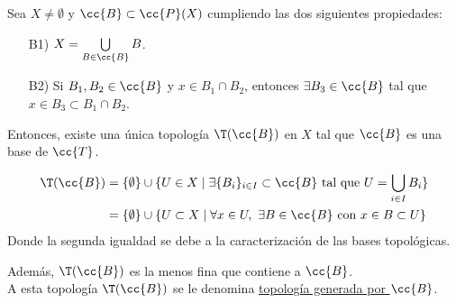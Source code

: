 \begin{teo}\label{teo:TopoGenerada_Bases}
    Sea $X\neq \emptyset$ y $\cc{B}\subset \cc{P}(X)$ cumpliendo las dos siguientes propiedades:
    \begin{enumerate}
        \item[B1)] $X=\bigcup\limits_{B\in \cc{B}} B$.
        \item[B2)] Si $B_1, B_2\in \cc{B}$ y $x\in B_1\cap B_2$, entonces $\exists B_3\in \cc{B}$ tal que $x\in B_3\subset B_1\cap B_2$.
    \end{enumerate}

    Entonces, existe una única topología $\T(\cc{B})$ en $X$ tal que $\cc{B}$ es una base de $\cc{T}$.

    \begin{equation*}\begin{split}
        \T(\cc{B}) &= \{\emptyset\}\cup \{U\in X\mid \exists \{B_i\}_{i\in I}\subset \cc{B} \text{ tal que }U=\bigcup_{i\in I} B_i\} \\
        &= \{\emptyset\} \cup \{U\subset X\mid \forall x\in U,~\exists B\in \cc{B} \text{ con } x\in B\subset U\}
    \end{split}\end{equation*}
    Donde la segunda igualdad se debe a la caracterización de las bases topológicas.

    Además, $\T(\cc{B})$ es la menos fina que contiene a $\cc{B}$.\\

    A esta topología $\T(\cc{B})$ se le denomina \ul{topología generada por $\cc{B}$}.
\end{teo}

